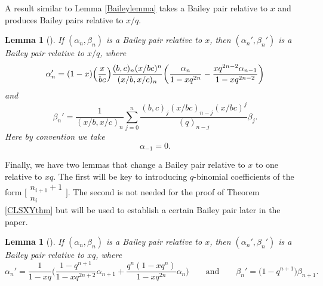 \documentclass[11pt]{article}
\numberwithin{equation}{section}
\newtheorem{Lemma}[Theorem]{Lemma}
\numberwithin{equation}{section}
\begin{document}
A result similar to Lemma \ref{Baileylemma} takes a Bailey pair relative to $x$ and produces Bailey pairs relative to $x/q$.
\begin{Lemma}[\cite{AABLattice}] \label{Baileylatticelemma}
	If $(\alpha_n,\beta_n)$ is a Bailey pair relative to $x$, then $(\alpha_n',\beta_n')$ is a Bailey pair relative to $x/q$, where
	\begin{equation*} %
		\alpha_n' = (1-x) \Bigl(\frac{x}{bc} \Bigr) \frac{(b,c)_n(x/bc)^n}{(x/b,x/c)_n}\biggl(\frac{\alpha_n}{1-xq^{2n}} - \frac{xq^{2n-2}\alpha_{n-1}}{1-xq^{2n-2}} \biggr)
	\end{equation*}
and
	\begin{equation*} %
		\beta_n' = \frac{1}{(x/b,x/c)_n} \sum_{j=0}^n \frac{(b,c)_j(x/bc)_{n-j} (x/bc)^j}{(q)_{n-j}} \beta_j.
	\end{equation*}
Here by convention we take
	\begin{equation} \label{eqn:latticeextracond}
		\alpha_{-1} = 0.
	\end{equation}
\end{Lemma}


Finally, we have two lemmas that change a Bailey pair relative to $x$ to one relative to $xq$. The first will be key to introducing $q$-binomial coefficients of the form $\bigl[\begin{smallmatrix} n_{i+1} + 1 \\ n_i \end{smallmatrix}\bigr]$. The second is not needed for the proof of Theorem \ref{CLSXYthm} but will be used to establish a certain Bailey pair later in the paper.
\begin{Lemma}[\cite{Lo1}] \label{littlelemma}
	If $(\alpha_n,\beta_n)$ is a Bailey pair relative to $x$, then $(\alpha_n',\beta_n')$ is a Bailey pair relative to $xq$, where
	\begin{equation*} %
		\alpha_n' = \frac{1}{1-xq} \biggl(\frac{1-q^{n+1}}{1-xq^{2n+2}} \alpha_{n+1} + \frac{q^n(1-xq^n)}{1-xq^{2n}} \alpha_n \biggr)
	\qquad
	\text{and}
	\qquad %
		\beta_n' = \bigl(1-q^{n+1}\bigr)\beta_{n+1}.
	\end{equation*}
\end{Lemma}
\end{document}
